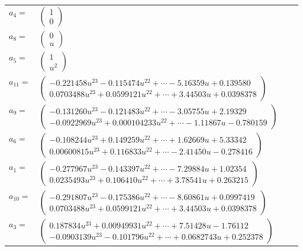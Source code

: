 \documentclass[1p]{elsarticle_modified}
\theoremstyle{definition}
\begin{document}
\begin{tabular}{m{7pt} m{180pt} m{7pt} m{180pt} }
\flushright $a_{4}=$&$\begin{pmatrix}1\\0\end{pmatrix}$ \\
\flushright $a_{8}=$&$\begin{pmatrix}0\\u\end{pmatrix}$ \\
\flushright $a_{5}=$&$\begin{pmatrix}1\\u^2\end{pmatrix}$ \\
\flushright $a_{11}=$&$\begin{pmatrix}-0.221458 u^{23}-0.115474 u^{22}+\cdots-5.16359 u+0.139580\\0.0703488 u^{23}+0.0599121 u^{22}+\cdots+3.44503 u+0.0398378\end{pmatrix}$ \\
\flushright $a_{9}=$&$\begin{pmatrix}-0.131260 u^{23}-0.121483 u^{22}+\cdots-3.05755 u+2.19329\\-0.0922969 u^{23}+0.000104233 u^{22}+\cdots-1.11867 u-0.780159\end{pmatrix}$ \\
\flushright $a_{6}=$&$\begin{pmatrix}-0.108244 u^{23}+0.149259 u^{22}+\cdots+1.62669 u+5.33342\\0.00600815 u^{23}+0.116833 u^{22}+\cdots-2.41450 u-0.278416\end{pmatrix}$ \\
\flushright $a_{1}=$&$\begin{pmatrix}-0.277967 u^{23}-0.143397 u^{22}+\cdots-7.29884 u+1.02354\\0.0235493 u^{23}+0.106410 u^{22}+\cdots+3.78541 u+0.263215\end{pmatrix}$ \\
\flushright $a_{10}=$&$\begin{pmatrix}-0.291807 u^{23}-0.175386 u^{22}+\cdots-8.60861 u+0.0997419\\0.0703488 u^{23}+0.0599121 u^{22}+\cdots+3.44503 u+0.0398378\end{pmatrix}$ \\
\flushright $a_{3}=$&$\begin{pmatrix}0.187834 u^{23}+0.00949931 u^{22}+\cdots+7.51428 u-1.76112\\-0.0903139 u^{23}-0.101796 u^{22}+\cdots+0.0682743 u+0.252378\end{pmatrix}$ \\

\end{tabular}
\end{document}
